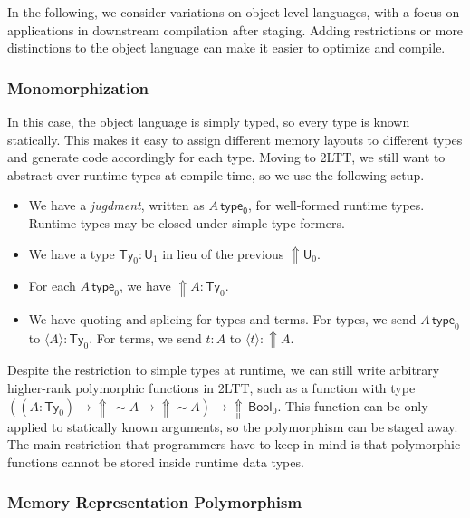 \documentclass[acmsmall,screen]{acmart}
\newcommand{\msf}[1]{\mathsf{#1}}
\newcommand{\Lift}{{\Uparrow}}
\newcommand{\spl}{{\sim}}
\newcommand{\qut}[1]{\langle #1\rangle}
\newcommand{\U}{\msf{U}}
\newcommand{\Ty}{\msf{Ty}}
\newcommand{\Bool}{\msf{Bool}}
\theoremstyle{remark}
\begin{document}
In the following, we consider variations on object-level languages, with a focus
on applications in downstream compilation after staging. Adding restrictions or
more distinctions to the object language can make it easier to optimize and
compile.

\subsubsection{Monomorphization}\label{sec:monomorphization}

In this case, the object language is simply typed, so every type is known
statically. This makes it easy to assign different memory layouts to different
types and generate code accordingly for each type. Moving to 2LTT, we still
want to abstract over runtime types at compile time, so we use the following
setup.
\begin{itemize}
\item We have a \emph{jugdment}, written as $A\,\msf{type_0}$, for well-formed
  runtime types. Runtime types may be closed under simple type formers.
\item We have a type $\Ty_0 : \U_1$ in lieu of the previous $\Lift \U_0$.
\item For each $A\,\msf{type}_0$, we have $\Lift A : \Ty_0$.
\item We have quoting and splicing for types and terms. For types, we send $A\,
  \msf{type}_0$ to $\qut{A} : \Ty_0$. For terms, we send $t : A$ to $\qut{t} :
  \Lift A$.
\end{itemize}
Despite the restriction to simple types at runtime, we can still write arbitrary
higher-rank polymorphic functions in 2LTT, such as a function with type $((A : \Ty_0)
\to \Lift\,\spl A \to \Lift \spl A) \to \Lift\,\Bool_0$. This function can be
only applied to statically known arguments, so the polymorphism can be staged
away. The main restriction that programmers have to keep in mind is that
polymorphic functions cannot be stored inside runtime data types.


\subsubsection{Memory Representation Polymorphism}
\end{document}
